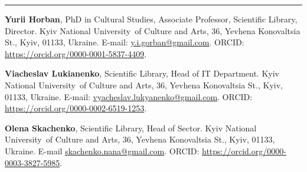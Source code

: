 \begin{center}\rule{0.5\linewidth}{0.5pt}\end{center}

\textbf{Yurii Horban}, PhD in Cultural Studies, Associate Professor,
Scientific Library, Director. Kyiv National University~of Culture and
Arts, 36, Yevhena Konovaltsia St., Kyiv, 01133, Ukraine. E-mail:
\href{mailto:y.i.gorban@gmail.com}{y.i.gorban@gmail.com}. ORCID: \url{https://orcid.org/0000-0001-5837-4409}.

\textbf{Viacheslav Lukianenko}, Scientific Library, Head of IT
Department. Kyiv National University~of Culture and Arts, 36, Yevhena
Konovaltsia St., Kyiv, 01133, Ukraine. E-mail:
\href{mailto:vyacheslav.lukyanenko@gmail.com}{vyacheslav.lukyanenko@gmail.com}. ORCID: \url{https://orcid.org/0000-0002-6519-1253}.

\textbf{Olena Skachenko}, Scientific Library, Head of Sector. Kyiv
National University~of Culture and Arts, 36, Yevhena Konovaltsia St.,
Kyiv, 01133, Ukraine. E-mail \href{mailto:skachenko.nana@gmail.com}{skachenko.nana@gmail.com}. ORCID:
\url{https://orcid.org/0000-0003-3827-5985}.
